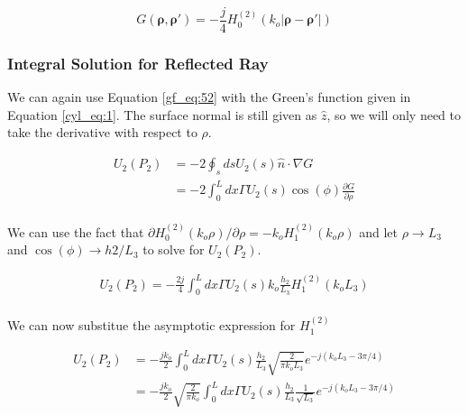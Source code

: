 \begin{equation}
G\left(\boldsymbol{\rho},\boldsymbol{\rho}'\right) = -\frac{j}{4}H_0^{(2)}\left(k_o|\boldsymbol{\rho} - \boldsymbol{\rho}' | \right)
\label{cyl_eq:1}
\end{equation}
\renewcommand{\baselinestretch}{2} \small\normalsize

\subsubsection{Integral Solution for Reflected Ray}
We can again use Equation \ref{gf_eq:52} with the Green's function given in Equation \ref{cyl_eq:1}. The surface normal is still given as $\hat{z}$, so we will only need to take the derivative with respect to $\rho$.
 
\begin{equation}
\begin{aligned}
U_2(P_2) &= -2\oint_s ds U_2(s)\hat{n}\cdot\nabla G\\
&= -2\int_0^L dx \Gamma U_2(s)\cos(\phi)\frac{\partial G}{\partial \rho}\\
\end{aligned}
\label{cyl_eq:6}
\end{equation}
\renewcommand{\baselinestretch}{2} \small\normalsize

We can use the fact that $\partial H_0^{(2)}(k_o\rho)/\partial \rho = -k_oH_1^{(2)}(k_o\rho)$ and let $\rho \rightarrow L_3$ and $\cos(\phi) \rightarrow h2/L_3$ to solve for $U_2(P_2)$.

\begin{equation}
\begin{aligned}
U_2(P_2) = -\frac{2j}{4}\int_0^L dx \Gamma U_2(s)k_o\frac{h_2}{L_3}H_1^{(2)}(k_oL_3)\\
\label{cyl_eq:7}
\end{aligned}
\end{equation}
\renewcommand{\baselinestretch}{2} \small\normalsize

\noindent We can now substitue the asymptotic expression for $H_1^{(2)}$

\begin{equation}
\begin{aligned}
U_2(P_2) &= -\frac{jk_o}{2}\int_0^L dx \Gamma U_2(s)\frac{h_2}{L_3}\sqrt{\frac{2}{\pi k_o L_3}}e^{-j(k_oL_3-3\pi /4)}\\
&= -\frac{jk_o}{2}\sqrt{\frac{2}{\pi k_o}}\int_0^L dx \Gamma U_2(s)\frac{h_2}{L_3}\frac{1}{\sqrt{L_3}}e^{-j(k_oL_3-3\pi /4)} \\
\label{cyl_eq:7b}
\end{aligned}
\end{equation}
\renewcommand{\baselinestretch}{2} \small\normalsize

